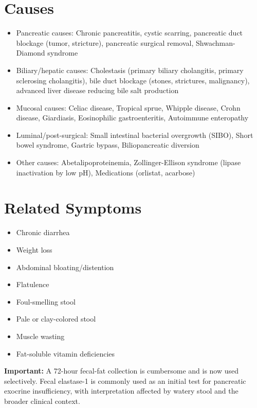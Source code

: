 \section*{Causes}
\begin{itemize}
  \item Pancreatic causes: Chronic pancreatitis, cystic scarring, pancreatic duct blockage (tumor, stricture), pancreatic surgical removal, Shwachman-Diamond syndrome
  \item Biliary/hepatic causes: Cholestasis (primary biliary cholangitis, primary sclerosing cholangitis), bile duct blockage (stones, strictures, malignancy), advanced liver disease reducing bile salt production
  \item Mucosal causes: Celiac disease, Tropical sprue, Whipple disease, Crohn disease, Giardiasis, Eosinophilic gastroenteritis, Autoimmune enteropathy
  \item Luminal/post-surgical: Small intestinal bacterial overgrowth (SIBO), Short bowel syndrome, Gastric bypass, Biliopancreatic diversion
  \item Other causes: Abetalipoproteinemia, Zollinger-Ellison syndrome (lipase inactivation by low pH), Medications (orlistat, acarbose)
\end{itemize}

\section*{Related Symptoms}
\begin{itemize}
  \item Chronic diarrhea
  \item Weight loss
  \item Abdominal bloating/distention
  \item Flatulence
  \item Foul-smelling stool
  \item Pale or clay-colored stool
  \item Muscle wasting
  \item Fat-soluble vitamin deficiencies
\end{itemize}
\textbf{Important:} A 72-hour fecal-fat collection is cumbersome and is now used selectively. Fecal elastase-1 is commonly used as an initial test for pancreatic exocrine insufficiency, with interpretation affected by watery stool and the broader clinical context.

